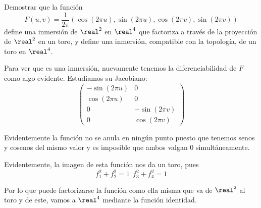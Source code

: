 \begin{problem}[7]

Demostrar que la función
\[F(u,v)=\frac{1}{2π}\left(\cos(2πu),\sin(2πu),\cos(2πv),\sin(2πv) \right)\]
define una inmersión de $\real^2$ en $\real^4$ que factoriza a través de la proyección de $\real^2$ en un toro, y define una inmersión, compatible con la topología, de un toro en $\real^4$.

\solution


Para ver que es una inmersión, nuevamente tenemos la diferenciabilidad de $F$ como algo evidente. Estudiamos su Jacobiano:
\[ \left( \begin{array}{cc}
-\sin(2πu) & 0 \\
\cos(2πu) & 0 \\
0 & -\sin(2πv) \\
0 & \cos(2πv) \end{array} \right)\]

Evidentemente la función no se anula en ningún punto puesto que tenemos senos y cosenos del mismo valor y es imposible que ambos valgan 0 simultáneamente.

Evidentemente, la imagen de esta función nos da un toro, pues
\[f_1^2+f_2^2 = 1 \ \ f_3^2+f_4^2 = 1\]

Por lo que puede factorizarse la función como ella misma que va de $\real^2$ al toro y de este, vamos a $\real^4$ mediante la función identidad.
\end{problem}

